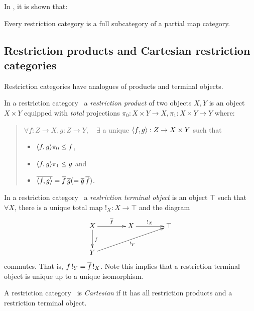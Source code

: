 In \cite{cockettlack2003:restcategories2}, it is shown that:
\begin{theorem}
  Every restriction category is a full subcategory of a partial map category.
\end{theorem}
\subsection{Restriction products and Cartesian restriction categories} %
\label{sub:restriction_products_and_cartesian_restriction_categories}


Restriction categories have analogues of products and terminal objects.

\begin{definition}
  In a restriction category \X\, a \emph{restriction product}  of two objects $X, Y$ is an 
  object $X\times Y$ equipped with \emph{total} projections 
  $\pi_0:X\times Y\to X, \pi_1:X\times Y\to Y $ where:
  \begin{quote}
    $\forall f:Z\to X, g: Z\to Y,\quad \exists$ a unique $\langle f,g\rangle:Z \to X\times Y$ such that
    \begin{itemize}
      \item $\langle f,g\rangle \pi_0 \le f$,
      \item $\langle f,g\rangle \pi_1 \le g$ and
      \item $\overline{\langle f,g\rangle} = \overline{f}\, \overline{g} ( = \overline{g}\, \overline{f})$.
    \end{itemize}
  \end{quote}
\end{definition}

\begin{definition}
  In a restriction category \X\, a \emph{restriction terminal object}
  is an object $\top$ such that $\forall X$, there is a
  unique total map $!_X : X \to \top$ and the diagram
  \[
    \xymatrix @C=40pt @R=25pt{
      X \ar[r]^{\restr{f}} \ar[d]^{f} & X \ar[r]^{!_X}  &\top  \\
      Y \ar[urr]_{!_Y}
    }
  \]
  commutes. That is,  $f\, !_Y = \overline{f}\, !_X$. Note this implies
  that a restriction terminal object is unique up to a unique isomorphism.
\end{definition}

\begin{definition}
  A restriction category \X\ is \emph{Cartesian} if it has all restriction products
  and a restriction terminal object.
\end{definition}

